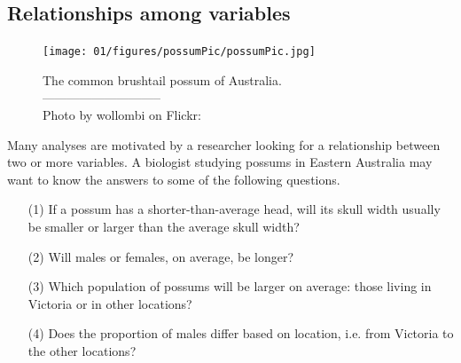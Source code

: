 \subsection{Relationships among variables}
\label{variableRelations}

\setlength{\captionwidth}{99mm}
\begin{figure}
\begin{center}
\texttt{[image: 01/figures/possumPic/possumPic.jpg]} \\
\addvspace{2mm}
\begin{minipage}{\textwidth}
   \caption[possums]{The common brushtail possum of Australia.\vspace{-1mm} \\
   -----------------------------\vspace{-2mm}\\
   {\footnotesize Photo by wollombi on Flickr: }\vspace{-8mm}}
   \label{possumPic}
\end{minipage}
\vspace{3mm}
\end{center}
\end{figure}
\setlength{\captionwidth}{\mycaptionwidth}

Many analyses are motivated by a researcher looking for a relationship between two or more variables. A biologist studying possums in Eastern Australia may want to know the answers to some of the following questions.
\begin{enumerate}
\setlength{\itemsep}{0mm}
\item[(1)]\label{questionAboutPossumHeadLengthAndWidth} If a possum has a shorter-than-average head, will its skull width usually be smaller or larger than the average skull width? \label{possumHeadSizeQuestion}
\item[(2)]\label{maleOrFemalePossumsLonger} Will males or females, on average, be longer? \label{possibleCausationQuestionForPossums}
\item[(3)]\label{whichPopulationOfPossumWillBeLargerOnAverage} Which population of possums will be larger on average: those living in Victoria or in other locations?
\item[(4)]\label{doesTheProportionOfMalesDifferBasedOnLocation} Does the proportion of males differ based on location, i.e. from Victoria to the other locations?
\end{enumerate}

